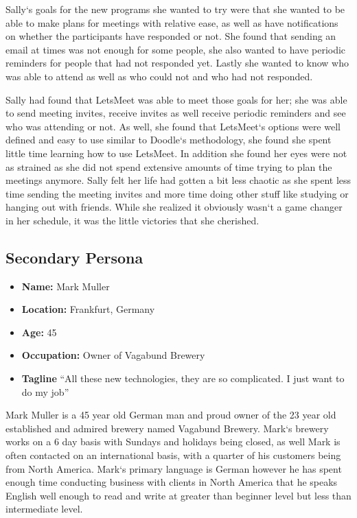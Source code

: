 \documentclass{sigchi}
\begin{document}
		Sally`s goals for the new programs she wanted to try were that she wanted to be able to make plans for meetings with relative ease, as well as have notifications on whether the participants have responded or not. She found that sending an email at times was not enough for some people, she also wanted to have periodic reminders for people that had not responded yet. Lastly she wanted to know who was able to attend as well as who could not and who had not responded.

		Sally had found that LetsMeet was able to meet those goals for her; she was able to send meeting invites, receive invites as well receive periodic reminders and see who was attending or not. As well, she found that LetsMeet`s options were well defined and easy to use similar to Doodle`s methodology, she found she spent little time learning how to use LetsMeet. In addition she found her eyes were not as strained as she did not spend extensive amounts of time trying to plan the meetings anymore. Sally felt her life had gotten a bit less chaotic as she spent less time sending the meeting invites and more time doing other stuff like studying or hanging out with friends. While she realized it obviously wasn`t a game changer in her schedule, it was the little victories that she cherished.

\subsection{Secondary Persona}
\begin{itemize}
	\item \textbf{Name:} Mark Muller
	\item \textbf{Location:} Frankfurt, Germany
	\item \textbf{Age:} 45 
	\item \textbf{Occupation:} Owner of Vagabund Brewery
	\item \textbf{Tagline} ``All these new technologies, they are so complicated. I just want to do my job''
\end{itemize}

Mark Muller is a 45 year old German man and proud owner of the 23 year old established and admired brewery named Vagabund Brewery. Mark`s brewery works on a 6 day basis with Sundays and holidays being closed, as well Mark is often contacted on an international basis, with a quarter of his customers being from North America. Mark`s primary language is German however he has spent enough time conducting business with clients in North America that he speaks English well enough to read and write at greater than beginner level but less than intermediate level. 
\end{document}
